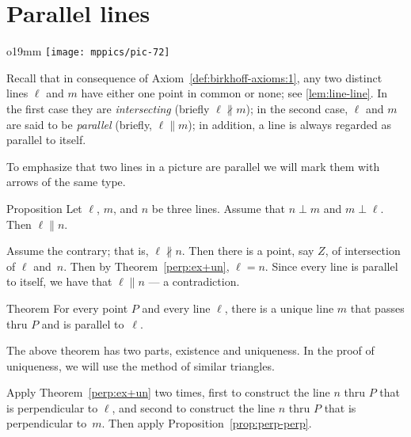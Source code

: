\chapter{Parallel lines}\label{chap:angle-sum}

{

\begin{wrapfigure}{o}{19mm}
\vskip-4mm
\centering
\texttt{[image: mppics/pic-72]}
\end{wrapfigure}

Recall that in consequence of Axiom~\ref{def:birkhoff-axioms:1},
any two distinct lines $\ell$ and $m$ have either one point in common or none; see \ref{lem:line-line}.
In the first case they are \emph{intersecting} (briefly $\ell\nparallel m$); 
in the second case, $\ell$ and $m$ are said to be \emph{parallel} (briefly, $\ell\parallel m$);
in addition, a line is always regarded as parallel to itself.

}

To emphasize that two lines in a picture are parallel we will mark them with arrows of the same type.



\begin{thm}[\abs]{Proposition}\label{prop:perp-perp} Let $\ell$, $m$, and $n$ be three lines.
Assume that $n\perp m$ and $m\perp \ell$.
Then $\ell\parallel n$. 
\end{thm}

Assume the contrary; 
that is, $\ell\nparallel n$.
Then there is a point, say $Z$, of intersection of $\ell$ and~$n$.
Then by Theorem~\ref{perp:ex+un},
$\ell=n$.
Since every line is parallel to itself, we have that $\ell\parallel n$ --- a contradiction.
\qeds

\begin{thm}{Theorem}\label{thm:parallel}
For every point $P$ and every line $\ell$,
there is a unique line $m$
that passes thru $P$ and is parallel to~$\ell$.
\end{thm}

The above theorem has two parts, existence and uniqueness.
In the proof of uniqueness, we will use the method of similar triangles.

Apply Theorem~\ref{perp:ex+un} two times,
first to construct the line $n$ thru $P$ that is perpendicular to $\ell$,
and second to construct the line $n$ thru $P$ that is perpendicular to~$m$.
Then apply Proposition~\ref{prop:perp-perp}.

